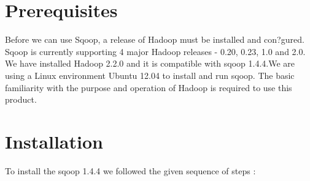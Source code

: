 \documentclass[letterpaper,10pt,english]{sphinxmanual}
\begin{document}
\section{Prerequisites}
\label{sqoop:prerequisites}
Before we can use Sqoop, a release of Hadoop must be installed and con?gured. Sqoop is currently supporting 4 major Hadoop releases - 0.20, 0.23, 1.0 and 2.0. We have installed Hadoop 2.2.0 and it is compatible with sqoop 1.4.4.We are using a Linux environment Ubuntu 12.04 to install and run sqoop. The basic familiarity with the purpose and operation of Hadoop is required to use this product.


\section{Installation}
\label{sqoop:installation}
To install the sqoop 1.4.4 we followed the given sequence of steps :
\end{document}
